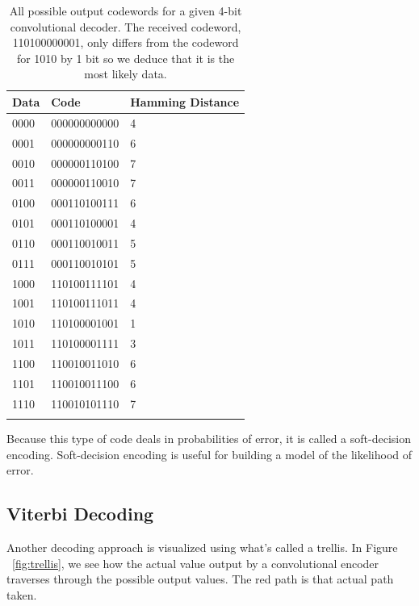 \documentclass[12pt]{article}
\begin{document}
\begin{longtable}{| p{} | p{} | p{} |} 
\hline
\textbf{Data} & \textbf{Code}    &     \textbf{Hamming Distance}  \\ \hline
0000 & 000000000000 & 4                \\ \hline
0001 & 000000000110 & 6                \\ \hline
0010 & 000000110100 & 7                \\ \hline
0011 & 000000110010 & 7                \\ \hline
0100 & 000110100111 & 6                \\ \hline
0101 & 000110100001 & 4                \\ \hline
0110 & 000110010011 & 5                \\ \hline
0111 & 000110010101 & 5                \\ \hline
1000 & 110100111101 & 4                \\ \hline
1001 & 110100111011 & 4                \\ \hline
1010 & 110100001001 & 1                \\ \hline
1011 & 110100001111 & 3                \\ \hline
1100 & 110010011010 & 6                \\ \hline
1101 & 110010011100 & 6                \\ \hline
1110 & 110010101110 & 7                \\ \hline
\caption{All possible output codewords for a given 4-bit convolutional decoder. The received codeword, 110100000001, only differs from the codeword for 1010 by 1 bit so we deduce that it is the most likely data.}
\label{tab:tab}
\end{longtable}

Because this type of code deals in probabilities of error, it is called a soft-decision encoding. Soft-decision encoding is useful for building a model of the likelihood of error. \cite{tanenbaum}

\subsection{Viterbi Decoding}

Another decoding approach is visualized using what's called a trellis. In Figure ~\ref{fig:trellis}, we see how the actual value output by a convolutional encoder traverses through the possible output values. The red path is that actual path taken.
\end{document}
